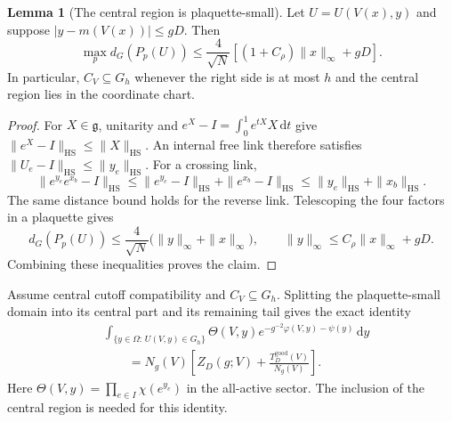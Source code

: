 \documentclass[10pt,reqno]{amsart}
\theoremstyle{definition}
\newtheorem{lemma}[definition]{Lemma}
\theoremstyle{remark}
\numberwithin{equation}{section}
\numberwithin{figure}{section}
\newcommand{\g}{\mathfrak g}
\newcommand{\dd}{\mathrm d}
\begin{document}
\begin{lemma}[The central region is plaquette-small]\label{lem:central-plaquette-small}
Let $U=U(V(x),y)$ and suppose $|y-m(V(x))|\le gD$. Then
\begin{equation}\label{eq:central-plaquette-bound}
\max_p d_G(P_p(U))
\le\frac4{\sqrt N}\left[(1+C_\rho)\|x\|_\infty+gD\right].
\end{equation}
In particular, $C_V\subseteq G_h$ whenever the right side is at most
$h$ and the central region lies in the coordinate chart.
\end{lemma}
\begin{proof}
For $X\in\g$, unitarity and
$e^X-I=\int_0^1e^{tX}X\,\dd t$ give
$\|e^X-I\|_{\mathrm{HS}}\le\|X\|_{\mathrm{HS}}$.
An internal free link therefore satisfies
$\|U_e-I\|_{\mathrm{HS}}\le\|y_e\|_{\mathrm{HS}}$.
For a crossing link,
\begin{equation}\label{eq:central-crossing-link-bound}
\|e^{y_e}e^{x_b}-I\|_{\mathrm{HS}}
\le\|e^{y_e}-I\|_{\mathrm{HS}}+\|e^{x_b}-I\|_{\mathrm{HS}}
\le\|y_e\|_{\mathrm{HS}}+\|x_b\|_{\mathrm{HS}}.
\end{equation}
The same distance bound holds for the reverse link. Telescoping the
four factors in a plaquette gives
\begin{equation}\label{eq:central-plaquette-telescope}
d_G(P_p(U))\le\frac4{\sqrt N}
\bigl(\|y\|_\infty+\|x\|_\infty\bigr),\qquad
\|y\|_\infty\le C_\rho\|x\|_\infty+gD.
\end{equation}
Combining these inequalities proves the claim.
\end{proof}

Assume central cutoff compatibility and $C_V\subseteq G_h$. Splitting
the plaquette-small domain into its central part and its remaining
tail gives the exact identity
\begin{equation}\label{eq:plaquette-small-normalized-identity}
\begin{aligned}
&\int_{\{y\in\Omega:\,U(V,y)\in G_h\}}
\Theta(V,y)e^{-g^{-2}\varphi(V,y)-\psi(y)}\,\dd y\\
&\qquad=N_g(V)\left[Z_D(g;V)
+\frac{T_D^{\mathrm{good}}(V)}{N_g(V)}\right].
\end{aligned}
\end{equation}
Here $\Theta(V,y)=\prod_{e\in I}\chi(e^{y_e})$ in the all-active
sector. The inclusion of the central region is needed for this
identity.
\end{document}

